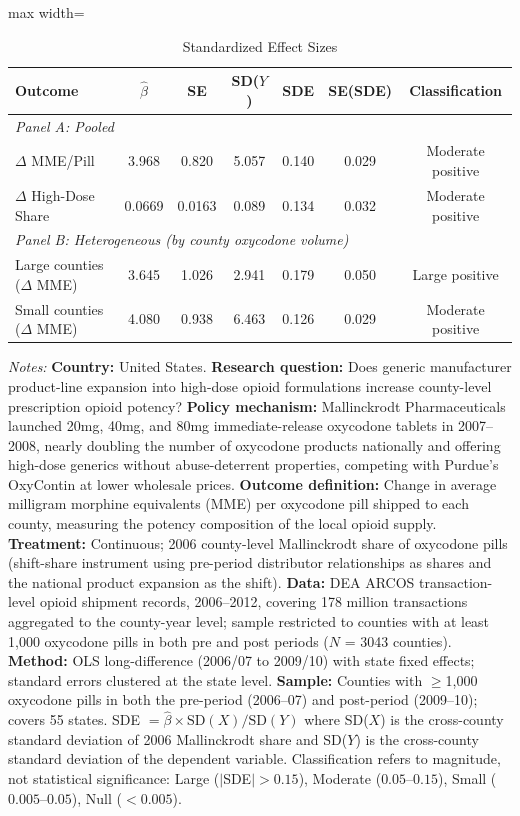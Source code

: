 \begin{table}[htbp]
\centering
\caption{Standardized Effect Sizes}
\label{tab:sde}
\begin{adjustbox}{max width=\textwidth}
\begin{tabular}{lcccccc}
\hline\hline
Outcome & $\hat{\beta}$ & SE & SD($Y$) & SDE & SE(SDE) & Classification \\
\hline
\multicolumn{7}{l}{\textit{Panel A: Pooled}} \\
$\Delta$ MME/Pill & 3.968 & 0.820 & 5.057 & 0.140 & 0.029 & Moderate positive \\
$\Delta$ High-Dose Share & 0.0669 & 0.0163 & 0.089 & 0.134 & 0.032 & Moderate positive \\
\hline
\multicolumn{7}{l}{\textit{Panel B: Heterogeneous (by county oxycodone volume)}} \\
Large counties ($\Delta$ MME) & 3.645 & 1.026 & 2.941 & 0.179 & 0.050 & Large positive \\
Small counties ($\Delta$ MME) & 4.080 & 0.938 & 6.463 & 0.126 & 0.029 & Moderate positive \\
\hline\hline
\end{tabular}
\end{adjustbox}
\par\vspace{0.5em}\parbox{\textwidth}{\small
\item \textit{Notes:} \textbf{Country:} United States. \textbf{Research question:} Does generic manufacturer product-line expansion into high-dose opioid formulations increase county-level prescription opioid potency? \textbf{Policy mechanism:} Mallinckrodt Pharmaceuticals launched 20mg, 40mg, and 80mg immediate-release oxycodone tablets in 2007--2008, nearly doubling the number of oxycodone products nationally and offering high-dose generics without abuse-deterrent properties, competing with Purdue's OxyContin at lower wholesale prices. \textbf{Outcome definition:} Change in average milligram morphine equivalents (MME) per oxycodone pill shipped to each county, measuring the potency composition of the local opioid supply. \textbf{Treatment:} Continuous; 2006 county-level Mallinckrodt share of oxycodone pills (shift-share instrument using pre-period distributor relationships as shares and the national product expansion as the shift). \textbf{Data:} DEA ARCOS transaction-level opioid shipment records, 2006--2012, covering 178 million transactions aggregated to the county-year level; sample restricted to counties with at least 1,000 oxycodone pills in both pre and post periods ($N$ = 3043 counties). \textbf{Method:} OLS long-difference (2006/07 to 2009/10) with state fixed effects; standard errors clustered at the state level. \textbf{Sample:} Counties with $\geq$1,000 oxycodone pills in both the pre-period (2006--07) and post-period (2009--10); covers 55 states. SDE $= \hat{\beta} \times \text{SD}(X) / \text{SD}(Y)$ where SD($X$) is the cross-county standard deviation of 2006 Mallinckrodt share and SD($Y$) is the cross-county standard deviation of the dependent variable. Classification refers to magnitude, not statistical significance: Large ($|$SDE$| > 0.15$), Moderate ($0.05$--$0.15$), Small ($0.005$--$0.05$), Null ($< 0.005$).
}
\end{table}
